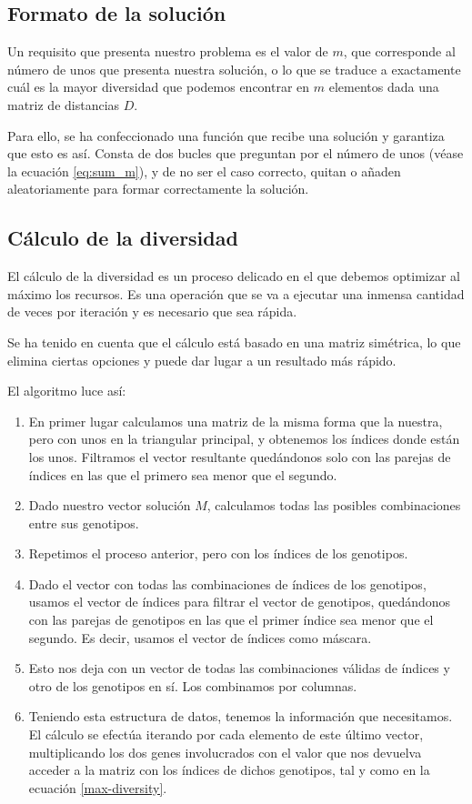\subsection{Formato de la solución}
Un requisito que presenta nuestro problema es el valor de $m$, que corresponde al número de unos que presenta nuestra solución, o lo que se traduce a exactamente cuál es la mayor diversidad que podemos encontrar en $m$ elementos dada una matriz de distancias $D$.

Para ello, se ha confeccionado una función  que recibe una solución y garantiza que esto es así. Consta de dos bucles  que preguntan por el número de unos (véase la ecuación \ref{eq:sum_m}), y de no ser el caso correcto, quitan o añaden aleatoriamente para formar correctamente la solución.


\subsection{Cálculo de la diversidad}
El cálculo de la diversidad es un proceso delicado en el que debemos optimizar al máximo los recursos. Es una operación que se va a ejecutar una inmensa cantidad de veces por iteración y es necesario que sea rápida.

Se ha tenido en cuenta que el cálculo está basado en una matriz simétrica, lo que elimina ciertas opciones y puede dar lugar a un resultado más rápido.

El algoritmo luce así:

\begin{enumerate}
    \item En primer lugar calculamos una matriz de la misma forma que la nuestra, pero con unos en la triangular principal, y obtenemos los índices donde están los unos. Filtramos el vector resultante quedándonos solo con las parejas de índices en las que el primero sea menor que el segundo.
    \item Dado nuestro vector solución $M$, calculamos todas las posibles combinaciones entre sus genotipos.
    \item Repetimos el proceso anterior, pero con los índices de los genotipos.
    \item Dado el vector con todas las combinaciones de índices de los genotipos, usamos el vector de índices para filtrar el vector de genotipos, quedándonos con las parejas de genotipos en las que el primer índice sea menor que el segundo. Es decir, usamos el vector de índices como máscara.
    \item Esto nos deja con un vector de todas las combinaciones válidas de índices y otro de los genotipos en sí. Los combinamos por columnas.
    \item Teniendo esta estructura de datos, tenemos la información que necesitamos. El cálculo se efectúa iterando por cada elemento de este último vector, multiplicando los dos genes involucrados con el valor que nos devuelva acceder a la matriz con los índices de dichos genotipos, tal y como en la ecuación \ref{max-diversity}.
\end{enumerate}


